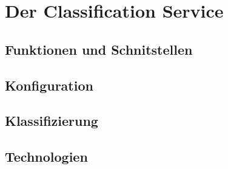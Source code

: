 \section{Der Classification Service}
    \subsection{Funktionen und Schnitstellen}
    \subsection{Konfiguration}
    \subsection{Klassifizierung}
        
    \subsection{Technologien}